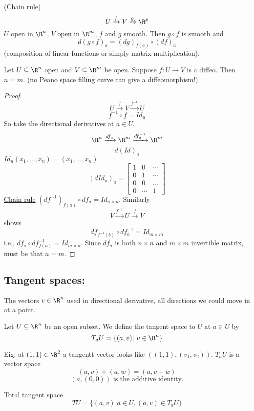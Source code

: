 \begin{theorem}
    (Chain rule)
    \newline
    $$U \xrightarrow{f} V \xrightarrow{g}\R^p$$
    $U$ open in $\R^n$, $V$ open in $\R^m$, $f$ and $g$ smooth. Then $g\circ f$ is smooth and
      $$d(g\circ f)_a=(dg)_{f(a)}\circ (df)_a$$
    (composition of linear functions or simply matrix multiplication).
\end{theorem}
\begin{theorem}
    Let $U \subseteq \R^n $ open and $V \subseteq \R^m $ be open. Suppose
    \newline
    $f:U\to V$ is a diffeo. Then $n=m$.
    \newline (no Peano space filling curve can give a diffeomorphism!)
\end{theorem}
\begin{proof}
  $$U\xrightarrow{f}V\xrightarrow{f^{-1}}U$$
  $$f^{-1}\circ f = Id_u$$
  So take the directional derivatives at $a\in U$.
  $$\R^n \xrightarrow{df_a}\R^m\xrightarrow{df^{-1}_a} \R^m$$
  $$d(Id)_a$$
  $Id_u(x_1,\dots ,x_n)=(x_1,\dots , x_n)$
  $$
(dId_u)_a=
\begin{bmatrix}
    1 & 0 & \cdots \\
    0 & 1 & \cdots \\
    0 & 0 &  \ldots  \\
    0 & \cdots & 1
\end{bmatrix}
  $$
  \underline{Chain rule}
  \newline
  $\left(df^{-1}\right)_{f(a)}\circ df_a =Id_{n\times n}$.
  Similarly
    $$V\xrightarrow{f^{-1}}U\xrightarrow{f}V$$
    shows
    $$df_{f^{-1}(b)}\circ df^{-1}_b=Id_{m\times m}$$
    i.e., $df_a \circ df^{-1}_{f(a)}=Id_{m\times n}$.
    \newline
    Since $df_a$ is both $n\times n$ and $m\times m$ invertible matrix, must be that $n=m$.
\end{proof}

\subsection*{Tangent spaces:}
The vectors $v\in \R^n$ used in directional derivative, all directions we could move in at a point.
\newline
\begin{definition}
  Let $U \subseteq \R^n $ be an open subset. We define the tangent space to $U$ at $a\in U$ by
    $$T_aU= \{(a,v) | v\in \R^n\}$$
\end{definition}
Eig: at $(1,1)\in \R^2$ a tangentt vector looks like $\left((1,1),(v_1,v_2)\right)$.
\newline
$T_aU$ is a vector space
  $$(a,v)+(a,w)=(a,v+w)$$
  $$(a,(0,0)) \text{ is the additive identity.}$$
\begin{definition}
  Total tangent space
    $$TU=\{ (a,v) | a\in U, (a,v)\in T_aU\}$$
\end{definition}

